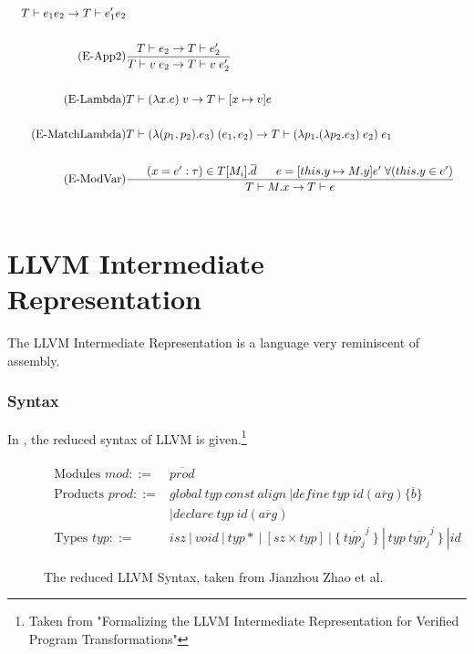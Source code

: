 \documentclass[10pt,a4paper,master=cws, masteroption=ai,english,inputenc=utf8]{kulemt}
\begin{document}
\begin{align*}
{T \vdash e_{1} e_{2} \rightarrow T \vdash e_{1}' e_{2}}\\ \\
\tag{E-App2}
&\frac{T \vdash e_{2} \rightarrow T \vdash e_{2}'}
{T \vdash v\;e_{2} \rightarrow T \vdash v\;e_{2}'}\\ \\
\tag{E-Lambda}
&T \vdash (\lambda x . e) \; v \rightarrow T \vdash [x \mapsto v]e \\ \\
\tag{E-MatchLambda}
&T \vdash (\lambda (p_{1},p_{2}) . e_{3}) \; (e_{1},e_{2}) \rightarrow T \vdash (\lambda p_{1}.(\lambda p_{2}.e_{3})\;e_{2})\; e_{1} \\
\\
\tag{E-ModVar}
&\frac{\;\;\;\;\;\; (x=e':\tau) \in T[M_{i}].\overline{d} \;\;\;\;\;\; e=[this.y\mapsto M.y]e'\;\forall (this.y \in e')}
{T \vdash M.x \rightarrow T \vdash e}\\
\\
\end{align*}
\section{LLVM Intermediate Representation}
The LLVM Intermediate Representation is a language very reminiscent of assembly. 
\subsubsection{Syntax}
In , the reduced syntax of LLVM is given.\footnote{Taken from "Formalizing the LLVM Intermediate
Representation for Verified Program
Transformations"}
\begin{figure}[!htb]
\begin{align*}
\begin{aligned}
\text{Modules }\mathit{mod} ::= &\overline{\mathit{prod}} \\
\text{Products }prod ::= & \mathit{global}\ \mathit{typ}\ \mathit{const}\ \mathit{align}\ | \mathit{define\ typ\ id(\overline{arg})\{\overline{b}\}}\\
&| \mathit{declare\ typ\ id(\overline{arg})} \\
\text{Types } \mathit{typ} ::= &\mathit{ isz\ |\ void\ |\ typ*\ |\ \left[sz \times typ\right]\ |\ \lbrace\ \overline{typ_{j}}^{j}\ \rbrace\ |\ typ\ \overline{typ_{j}}^{j}\ \rbrace\ | id}
\end{aligned}
\end{align*}
\label{fig:LLVMSyntax}
\caption{The reduced LLVM Syntax, taken from Jianzhou Zhao et al.}
\end{figure}
\end{document}
